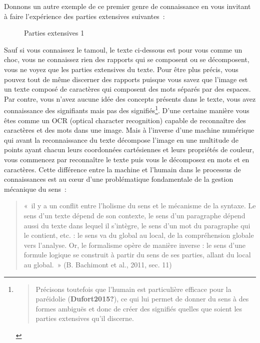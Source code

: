 \documentclass[
  a4paper,
  DIV=11,
  numbers=noendperiod]{scrreprt}
\begin{document}
Donnons un autre exemple de ce premier genre de connaissance en vous
invitant à faire l'expérience des parties extensives suivantes~:

\begin{figure}


\caption{\label{fig-partExt1}Parties extensives 1}

\end{figure}%

Sauf si vous connaissez le tamoul, le texte ci-dessous est pour vous
comme un choc, vous ne connaissez rien des rapports qui se composent ou
se décomposent, vous ne voyez que les parties extensives du texte. Pour
être plus précis, vous pouvez tout de même discerner des rapports
puisque vous savez que l'image est un texte composé de caractères qui
composent des mots séparés par des espaces. Par contre, vous n'avez
aucune idée des concepts présents dans le texte, vous avez connaissance
des signifiants mais pas des signifiés\footnote{\begin{quote}
  Précisons toutefois que l'humain est particulière efficace pour la
  paréidolie (\textbf{Dufort2015?}), ce qui lui permet de donner du sens
  à des formes ambiguës et donc de créer des signifiés quelles que
  soient les parties extensives qu'il discerne.
  \end{quote}}. D'une certaine manière vous êtes comme un OCR (optical
character recognition) capable de reconnaître des caractères et des mots
dans une image. Mais à l'inverse d'une machine numérique qui avant la
reconnaissance du texte décompose l'image en une multitude de points
ayant chacun leurs coordonnées cartésiennes et leurs propriétés de
couleur, vous commencez par reconnaître le texte puis vous le décomposez
en mots et en caractères. Cette différence entre la machine et l'humain
dans le processus de connaissances est au cœur d'une problématique
fondamentale de la gestion mécanique du sens~:

\begin{quote}
«~il y a un conflit entre l'holisme du sens et le mécanisme de la
syntaxe. Le sens d'un texte dépend de son contexte, le sens d'un
paragraphe dépend aussi du texte dans lequel il s'intègre, le sens d'un
mot du paragraphe qui le contient, etc. : le sens va du global au local,
de la compréhension globale vers l'analyse. Or, le formalisme opère de
manière inverse : le sens d'une formule logique se construit à partir du
sens de ses parties, allant du local au global.~» (B. Bachimont et al.,
2011, sec. 11)
\end{quote}
\end{document}
